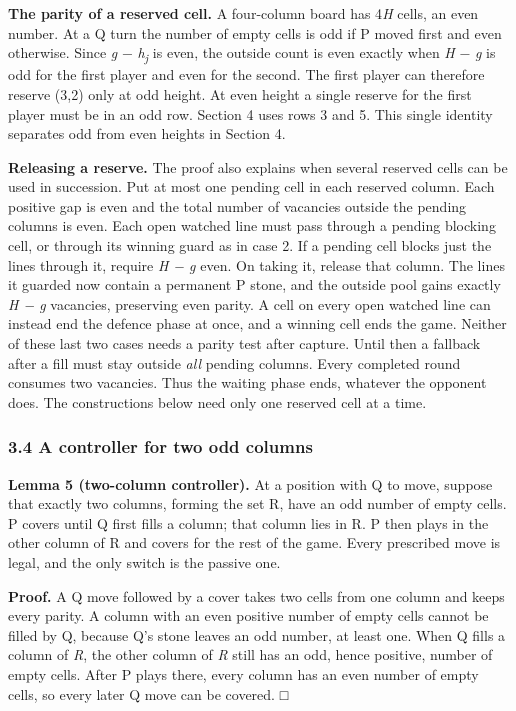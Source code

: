 \documentclass[
  a4paper,
]{article}
\begin{document}
\textbf{The parity of a reserved cell.} A four-column board has
4\emph{H} cells, an even number. At a Q turn the number of empty cells
is odd if P moved first and even otherwise. Since \emph{g} −
\emph{h}\textsubscript{\emph{j}} is even, the outside count is even
exactly when \emph{H} − \emph{g} is odd for the first player and even
for the second. The first player can therefore reserve (3,2) only at odd
height. At even height a single reserve for the first player must be in
an odd row. Section 4 uses rows 3 and 5. This single identity separates
odd from even heights in Section 4.

\textbf{Releasing a reserve.} The proof also explains when several
reserved cells can be used in succession. Put at most one pending cell
in each reserved column. Each positive gap is even and the total number
of vacancies outside the pending columns is even. Each open watched line
must pass through a pending blocking cell, or through its winning guard
as in case 2. If a pending cell blocks just the lines through it,
require \emph{H − g} even. On taking it, release that column. The lines
it guarded now contain a permanent P stone, and the outside pool gains
exactly \emph{H − g} vacancies, preserving even parity. A cell on every
open watched line can instead end the defence phase at once, and a
winning cell ends the game. Neither of these last two cases needs a
parity test after capture. Until then a fallback after a fill must stay
outside \emph{all} pending columns. Every completed round consumes two
vacancies. Thus the waiting phase ends, whatever the opponent does. The
constructions below need only one reserved cell at a time.

\subsubsection{3.4 A controller for two odd
columns}\label{a-controller-for-two-odd-columns}

\textbf{Lemma 5 (two-column controller).} At a position with Q to move,
suppose that exactly two columns, forming the set R, have an odd number
of empty cells. P covers until Q first fills a column; that column lies
in R. P then plays in the other column of R and covers for the rest of
the game. Every prescribed move is legal, and the only switch is the
passive one.

\textbf{Proof.} A Q move followed by a cover takes two cells from one
column and keeps every parity. A column with an even positive number of
empty cells cannot be filled by Q, because Q's stone leaves an odd
number, at least one. When Q fills a column of \emph{R}, the other
column of \emph{R} still has an odd, hence positive, number of empty
cells. After P plays there, every column has an even number of empty
cells, so every later Q move can be covered. □
\end{document}
